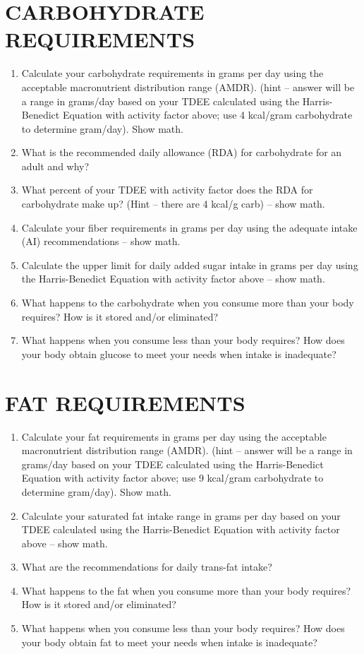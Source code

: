 \documentclass[
	title={Dietary Analysis Assignment - Nutrient Requirements},
	points={30}
]{fdsn201homework}
\begin{document}
\section{CARBOHYDRATE REQUIREMENTS}\label{sec:carbohydrate-requirements}
\begin{enumerate}[start=13]
	\item Calculate your carbohydrate requirements in grams per day using the acceptable macronutrient distribution range (AMDR). (hint – answer will be a range in grams/day based on your TDEE calculated using the Harris-Benedict Equation with activity factor above; use 4 kcal/gram carbohydrate to determine gram/day).
	Show math.
	\item What is the recommended daily allowance (RDA) for carbohydrate for an adult and why?
	\item What percent of your TDEE with activity factor does the RDA for carbohydrate make up? (Hint – there are 4 kcal/g carb) – show math.
	\item Calculate your fiber requirements in grams per day using the adequate intake (AI) recommendations – show math.
	\item Calculate the upper limit for daily added sugar intake in grams per day using the Harris-Benedict Equation with activity factor above – show math.
	\item What happens to the carbohydrate when you consume more than your body requires?
	How is it stored and/or eliminated?
	\item What happens when you consume less than your body requires?
	How does your body obtain glucose to meet your needs when intake is inadequate?
\end{enumerate}

\section{FAT REQUIREMENTS}\label{sec:fat-requirements}
\begin{enumerate}[start=20]
	\item Calculate your fat requirements in grams per day using the acceptable macronutrient distribution range (AMDR). (hint – answer will be a range in grams/day based on your TDEE calculated using the Harris-Benedict Equation with activity factor above; use 9 kcal/gram carbohydrate to determine gram/day).
	Show math.
	\item Calculate your saturated fat intake range in grams per day based on your TDEE calculated using the Harris-Benedict Equation with activity factor above – show math.
	\item What are the recommendations for daily trans-fat intake?
	\item What happens to the fat when you consume more than your body requires?
	How is it stored and/or eliminated?
	\item What happens when you consume less than your body requires?
	How does your body obtain fat to meet your needs when intake is inadequate?
\end{enumerate}
\end{document}
